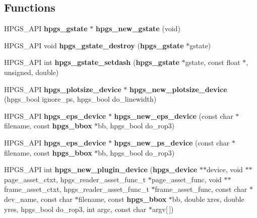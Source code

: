 \subsection*{Functions}
\begin{DoxyCompactItemize}
\item 
HPGS\_\-API {\bf hpgs\_\-gstate} $\ast$ {\bf hpgs\_\-new\_\-gstate} (void)
\item 
HPGS\_\-API void {\bf hpgs\_\-gstate\_\-destroy} ({\bf hpgs\_\-gstate} $\ast$gstate)
\item 
HPGS\_\-API int {\bf hpgs\_\-gstate\_\-setdash} ({\bf hpgs\_\-gstate} $\ast$gstate, const float $\ast$, unsigned, double)
\item 
HPGS\_\-API {\bf hpgs\_\-plotsize\_\-device} $\ast$ {\bf hpgs\_\-new\_\-plotsize\_\-device} (hpgs\_\-bool ignore\_\-ps, hpgs\_\-bool do\_\-linewidth)
\item 
HPGS\_\-API {\bf hpgs\_\-eps\_\-device} $\ast$ {\bf hpgs\_\-new\_\-eps\_\-device} (const char $\ast$filename, const {\bf hpgs\_\-bbox} $\ast$bb, hpgs\_\-bool do\_\-rop3)
\item 
HPGS\_\-API {\bf hpgs\_\-eps\_\-device} $\ast$ {\bf hpgs\_\-new\_\-ps\_\-device} (const char $\ast$filename, const {\bf hpgs\_\-bbox} $\ast$bb, hpgs\_\-bool do\_\-rop3)
\item 
HPGS\_\-API int {\bfseries hpgs\_\-new\_\-plugin\_\-device} ({\bf hpgs\_\-device} $\ast$$\ast$device, void $\ast$$\ast$page\_\-asset\_\-ctxt, hpgs\_\-reader\_\-asset\_\-func\_\-t $\ast$page\_\-asset\_\-func, void $\ast$$\ast$frame\_\-asset\_\-ctxt, hpgs\_\-reader\_\-asset\_\-func\_\-t $\ast$frame\_\-asset\_\-func, const char $\ast$dev\_\-name, const char $\ast$filename, const {\bf hpgs\_\-bbox} $\ast$bb, double xres, double yres, hpgs\_\-bool do\_\-rop3, int argc, const char $\ast$argv[$\,$])\label{group__device_ga32a98f875a08a2a1e5a511ee3f51c5f9}


\end{DoxyCompactItemize}
